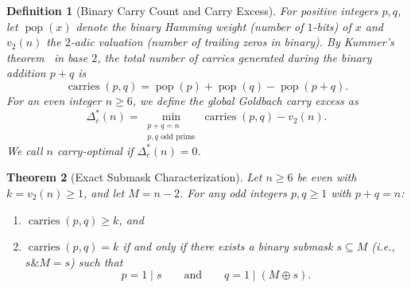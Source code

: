 \documentclass[11pt,a4paper]{article}
\newtheorem{theorem}{Theorem}
\newtheorem{definition}[theorem]{Definition}
\begin{document}
\begin{definition}[Binary Carry Count and Carry Excess]
For positive integers $p, q$, let $\operatorname{pop}(x)$ denote the binary Hamming weight (number of $1$-bits) of $x$ and $v_2(n)$ the $2$-adic valuation (number of trailing zeros in binary). By Kummer's theorem~\cite{kummer1852} in base $2$, the total number of carries generated during the binary addition $p + q$ is
\begin{equation}
\operatorname{carries}(p, q) = \operatorname{pop}(p) + \operatorname{pop}(q) - \operatorname{pop}(p + q).
\end{equation}
For an even integer $n \ge 6$, we define the \emph{global Goldbach carry excess} as
\begin{equation}
\Delta_c^*(n) = \min_{\substack{p + q = n \\ p, q \text{ odd prime}}} \operatorname{carries}(p, q) - v_2(n).
\end{equation}
We call $n$ \emph{carry-optimal} if $\Delta_c^*(n) = 0$.
\end{definition}

\begin{theorem}[Exact Submask Characterization]
\label{thm:submask}
Let $n \ge 6$ be even with $k = v_2(n) \ge 1$, and let $M = n - 2$. For any odd integers $p, q \ge 1$ with $p + q = n$:
\begin{enumerate}
    \item $\operatorname{carries}(p, q) \ge k$, and
    \item $\operatorname{carries}(p, q) = k$ if and only if there exists a binary submask $s \subseteq M$ (i.e., $s \mathbin{\&} M = s$) such that
    \begin{equation}
    p = 1 \mathbin{|} s \qquad\text{and}\qquad q = 1 \mathbin{|} (M \oplus s).
    \end{equation}
\end{enumerate}
\end{theorem}
\end{document}
